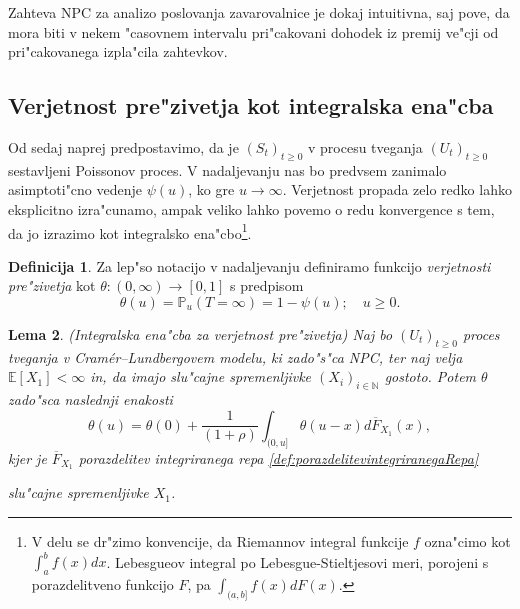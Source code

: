 \documentclass[12pt, a4paper, reqno]{amsart}
\theoremstyle{definition}
\newtheorem{definicija}{Definicija}[section]
\theoremstyle{plain}
\newtheorem{lema}[definicija]{Lema}
\newcommand{\N}{\mathbb{N}}
\newcommand{\E}{\mathbb{E}}
\newcommand{\Prob}{\mathbb{P}}
\newcommand{\1}{\mathds{1}}
\newcommand*{\refPriloga}[1]{%
  \begingroup
    \hypersetup{
      linkcolor=red,
      linkbordercolor=red,
    }%
    \ref{#1}%
  \endgroup
}
\begin{document}
        Zahteva NPC za analizo poslovanja zavarovalnice je dokaj intuitivna, saj pove, da mora  
        biti v nekem "casovnem intervalu pri"cakovani dohodek iz premij ve"cji od pri"cakovanega izpla"cila zahtevkov.

    \subsection{Verjetnost pre"zivetja kot integralska ena"cba} Od sedaj naprej predpostavimo, 
    da je $(S_t)_{t\geq0}$ v procesu tveganja $(U_t)_{t\geq0}$ sestavljeni Poissonov proces. V nadaljevanju nas bo predvsem zanimalo asimptoti"cno 
        vedenje $\psi(u)$, ko gre $u\rightarrow\infty$. Verjetnost propada zelo redko lahko eksplicitno 
        izra"cunamo, ampak veliko lahko povemo o redu konvergence s tem, da jo izrazimo kot integralsko
        ena"cbo\footnote{V delu se dr"zimo konvencije, da Riemannov integral funkcije $f$ ozna"cimo kot
        $\int_a^bf(x)dx$. Lebesgueov integral po Lebesgue-Stieltjesovi meri, porojeni s porazdelitveno
        funkcijo $F$, pa $\int_{(a, b]}f(x)dF(x)$.}.

    \begin{definicija}
        Za lep"so notacijo v nadaljevanju definiramo funkcijo \textit{verjetnosti pre"zivetja} kot
        $\theta:(0, \infty) \to [0, 1]$ s predpisom
        \begin{equation*}
            \theta(u) = \Prob_u\left(T=\infty\right) = 1 - \psi(u); \quad u\geq 0.
        \end{equation*}
        \label{def:verjetnostPrezivetja}
    \end{definicija}

    \begin{lema}(Integralska ena"cba za verjetnost pre"zivetja)
        Naj bo $(U_t)_{t\geq0}$ proces tveganja v Cramér--Lundbergovem modelu, ki zado"s"ca NPC, ter naj 
        velja $\E\left[X_1\right]<\infty$ in, da imajo slu"cajne spremenljivke $(X_i)_{i\in\N}$ 
        gostoto. Potem $\theta$ zado"sca naslednji enakosti
        \begin{equation}
            \theta(u) = \theta(0) + \frac{1}{(1+\rho)} \int_{(0, u]}\theta(u - x)d\overline{F}_{X_1}(x),
            \label{eq:verjetnostPrezivetja}
        \end{equation}
        kjer je $\overline{F}_{X_1}$ porazdelitev integriranega repa \refPriloga{def:porazdelitevintegriranegaRepa} 
        slu"cajne spremenljivke $X_1$.
        \label{lema:verjetnostPrezivetja}
    \end{lema}
\end{document}
